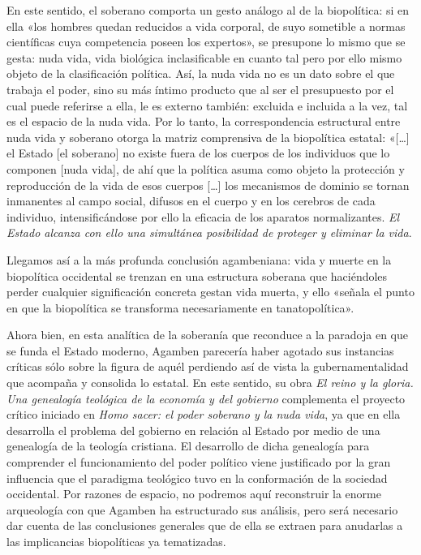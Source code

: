 En este sentido, el soberano comporta un gesto análogo al de la biopolítica: si en ella «los hombres quedan reducidos a vida corporal, de suyo sometible a normas científicas cuya competencia poseen los expertos», se presupone lo mismo que se gesta: nuda vida, vida biológica inclasificable en cuanto tal pero por ello mismo objeto de la clasificación política. Así, la nuda vida no es un dato sobre el que trabaja el poder, sino su más íntimo producto que al ser el presupuesto por el cual puede referirse a ella, le es externo también: excluida e incluida a la vez, tal es el espacio de la nuda vida. Por lo tanto, la correspondencia estructural entre nuda vida y soberano otorga la matriz comprensiva de la biopolítica estatal: «{[}\ldots{]} el Estado {[}el soberano{]} no existe fuera de los cuerpos de los individuos que lo componen {[}nuda vida{]}, de ahí que la política asuma como objeto la protección y reproducción de la vida de esos cuerpos {[}\ldots{]} los mecanismos de dominio se tornan inmanentes al campo social, difusos en el cuerpo y en los cerebros de cada individuo, intensificándose por ello la eficacia de los aparatos normalizantes. \emph{El Estado alcanza con ello una simultánea posibilidad de proteger y eliminar la vida}.

Llegamos así a la más profunda conclusión agambeniana: vida y muerte en la biopolítica occidental se trenzan en una estructura soberana que haciéndoles perder cualquier significación concreta gestan vida muerta, y ello «señala el punto en que la biopolítica se transforma necesariamente en tanatopolítica».

Ahora bien, en esta analítica de la soberanía que reconduce a la paradoja en que se funda el Estado moderno, Agamben parecería haber agotado sus instancias críticas sólo sobre la figura de aquél perdiendo así de vista la gubernamentalidad que acompaña y consolida lo estatal. En este sentido, su obra \emph{El reino y la gloria. Una genealogía teológica de la economía y del gobierno} complementa el proyecto crítico iniciado en \emph{Homo sacer: el poder soberano y la nuda vida}, ya que en ella desarrolla el problema del gobierno en relación al Estado por medio de una genealogía de la teología cristiana. El desarrollo de dicha genealogía para comprender el funcionamiento del poder político viene justificado por la gran influencia que el paradigma teológico tuvo en la conformación de la sociedad occidental. Por razones de espacio, no podremos aquí reconstruir la enorme arqueología con que Agamben ha estructurado sus análisis, pero será necesario dar cuenta de las conclusiones generales que de ella se extraen para anudarlas a las implicancias biopolíticas ya tematizadas.


